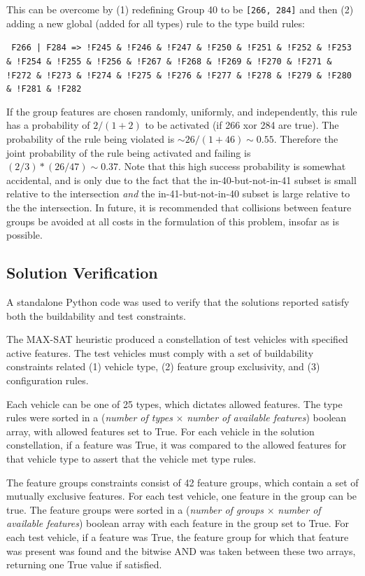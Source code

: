 \documentclass[aps,pra,twocolumn,superscriptaddress,groupedaddress]{revtex4}  %
\begin{document}
This can be overcome by (1) redefining Group 40 to be \texttt{[266, 284]} and
then (2) adding a new global (added for all types) rule to the type build rules:

\texttt{ F266 | F284 => !F245 \& !F246 \& !F247 \& !F250 \& !F251 \& !F252 \& !F253 \&
!F254 \& !F255 \& !F256 \& !F267 \& !F268 \& !F269 \& !F270 \& !F271 \& !F272 \& !F273 \&
!F274 \& !F275 \& !F276 \& !F277 \& !F278 \& !F279 \& !F280 \& !F281 \& !F282}

If the group features are chosen randomly, uniformly, and independently, this
rule has a probability of $2/(1+2)$ to be activated (if 266 xor 284 are true).
The probability of the rule being violated is $\sim 26/(1+46) \sim 0.55$.
Therefore the joint probability of the rule being activated and failing is
$(2/3) * (26/47) \sim 0.37$. Note that this high success probability is somewhat
accidental, and is only due to the fact that the in-40-but-not-in-41 subset is
small relative to the intersection \emph{and} the in-41-but-not-in-40 subset is
large relative to the the intersection. In future, it is recommended that
collisions between feature groups be avoided at all costs in the formulation of
this problem, insofar as is possible.

\subsection{Solution Verification}

A standalone Python code was used to verify that the solutions reported satisfy
both the buildability and test constraints.

The MAX-SAT heuristic produced a constellation of test vehicles with specified
active features. The test vehicles must comply with a set of buildability
constraints related (1) vehicle type, (2) feature group exclusivity, and
(3) configuration rules.

Each vehicle can be one of 25 types, which dictates allowed features. 
The type rules were sorted in a (\textit{number of types} $\times$
\textit{number of available features}) boolean array, with allowed features set
to True. For each vehicle in the solution constellation, if a feature was True,
it was compared to the allowed features for that vehicle type to assert that the
vehicle met type rules.

The feature groups constraints consist of 42 feature groups, which contain a set
of mutually exclusive features. For each test vehicle, one feature in the group can
be true. The feature groups were sorted in a (\textit{number of groups} $\times$
\textit{number of available features}) boolean array with each feature in the group
set to True. For each test vehicle, if a feature was True, the feature group for
which that feature was present was found and the bitwise AND was taken between
these two arrays, returning one True value if satisfied.
\end{document}
